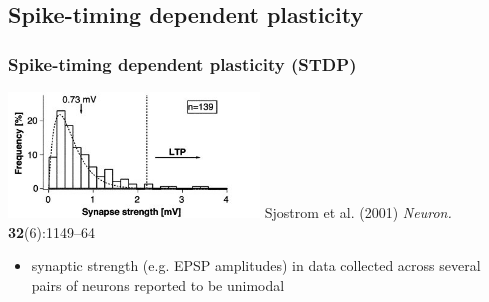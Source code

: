 \documentclass{beamer}
\begin{document}
\subsection{Spike-timing dependent plasticity}

\begin{frame}
  \frametitle{Spike-timing dependent plasticity (STDP)}

\includegraphics[width=0.5\textwidth]{./figures/stdp_exp}
\vspace*{3mm}
\tiny{Sjostrom et al. (2001)
\textit{Neuron.} \textbf{32}(6):1149--64}

\small
{
\begin{itemize}
\item synaptic strength (e.g. EPSP amplitudes) in data collected across several pairs of neurons reported to be unimodal
\end{itemize}
}

\end{frame}
\end{document}
